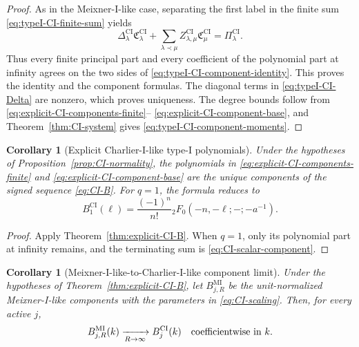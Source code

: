 \documentclass[10pt]{amsart}
\theoremstyle{plain}
\newtheorem{corollary}[theorem]{Corollary}
\theoremstyle{definition}
\theoremstyle{remark}
\begin{document}
\begin{proof}
As in the Meixner-I-like case, separating the first label in the finite sum
\eqref{eq:typeI-CI-finite-sum} yields
\[
 \Delta_\lambda^{\mathrm{CI}}\mathfrak C_\lambda^{\mathrm{CI}}
 +\sum_{\lambda\prec\mu}Z_{\lambda,\mu}^{\mathrm{CI}}
 \mathfrak C_\mu^{\mathrm{CI}}
 =\Pi_\lambda^{\mathrm{CI}}.
\]
Thus every finite principal part and every coefficient of the polynomial
part at infinity agrees on the two sides of
\eqref{eq:typeI-CI-component-identity}.  This proves the identity and
the component formulas.  The diagonal terms in
\eqref{eq:typeI-CI-Delta} are nonzero, which proves uniqueness. The degree
bounds follow from \eqref{eq:explicit-CI-components-finite}--
\eqref{eq:explicit-CI-component-base}, and Theorem~\ref{thm:CI-system}
gives \eqref{eq:typeI-CI-component-moments}.
\end{proof}

\begin{corollary}[Explicit Charlier-I-like type-I polynomials]
\label{cor:CI-explicit-components}
Under the hypotheses of Proposition~\ref{prop:CI-normality}, the
polynomials in \eqref{eq:explicit-CI-components-finite} and
\eqref{eq:explicit-CI-component-base} are the unique components of the
signed sequence \eqref{eq:CI-B}. For \(q=1\), the formula
reduces to
\begin{equation}
 B_1^{\mathrm{CI}}(\ell)
 =\frac{(-1)^n}{n!}{}_2F_0(-n,-\ell;-;-a^{-1}).
 \label{eq:CI-scalar-component}
\end{equation}
\end{corollary}

\begin{proof}
Apply Theorem~\ref{thm:explicit-CI-B}.  When \(q=1\), only its polynomial
part at infinity remains, and the terminating sum is
\eqref{eq:CI-scalar-component}.
\end{proof}

\begin{corollary}[Meixner-I-like-to-Charlier-I-like component limit]
\label{cor:MI-CI-component-limit}
Under the hypotheses of Theorem~\ref{thm:explicit-CI-B}, let
\(B_{j,R}^{\mathrm{MI}}\) be the unit-normalized Meixner-I-like
components with the parameters in \eqref{eq:CI-scaling}. Then, for every
active \(j\),
\begin{equation}
 B_{j,R}^{\mathrm{MI}}(k)
 \xrightarrow[R\to\infty]{}B_j^{\mathrm{CI}}(k)
 \quad\hbox{coefficientwise in }k.
 \label{eq:MI-CI-component-limit}
\end{equation}
\end{corollary}
\end{document}
